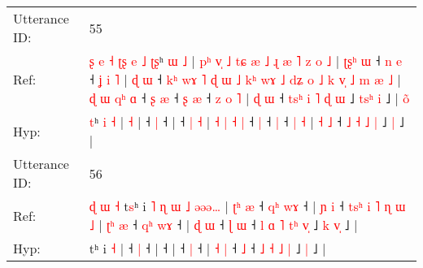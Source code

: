\documentclass[10pt]{article}
\DeclareRobustCommand{\hl}[1]{{\textcolor{red}{#1}}}
\begin{document}
\begin{longtable}{ll}
 \\
\midrule
Utterance ID: & 55 \\
Ref: & \hl{ʂ}\hl{ }\hl{e}\hl{ }\hl{˧}\hl{ }\hl{ʈ}\hl{ʂ}\hl{ }\hl{e}\hl{ }\hl{˩}\hl{ }\hl{ʈ}\hl{ʂ}ʰ \hl{ɯ} \hl{˩} |\hl{ }\hl{p}\hl{ʰ}\hl{ }\hl{v}\hl{̩}\hl{ }\hl{˩}\hl{ }\hl{t}\hl{ɕ}\hl{ }\hl{æ}\hl{ }\hl{˩}\hl{ }\hl{ɻ}\hl{ }\hl{æ}\hl{ }\hl{˥}\hl{ }\hl{z}\hl{ }\hl{o} \hl{˩} |\hl{ }\hl{ʈ}\hl{ʂ}\hl{ʰ}\hl{ }\hl{ɯ} ˧\hl{ }\hl{n} \hl{e} ˧\hl{ }\hl{ʝ}\hl{ }\hl{i}\hl{ }\hl{˥} |\hl{ }\hl{ɖ}\hl{ }\hl{ɯ} ˧\hl{ }\hl{k}\hl{ʰ}\hl{ }\hl{w}\hl{ɤ}\hl{ }\hl{˥}\hl{ }\hl{ɖ}\hl{ }\hl{ɯ}\hl{ }\hl{˩}\hl{ }\hl{k}\hl{ʰ}\hl{ }\hl{w}\hl{ɤ}\hl{ }\hl{˩}\hl{ }\hl{d}\hl{ʑ}\hl{ }\hl{o}\hl{ }\hl{˩}\hl{ }\hl{k}\hl{ }\hl{v}\hl{̩}\hl{ }\hl{˩}\hl{ }\hl{m} \hl{æ} \hl{˩} | \hl{ɖ} \hl{ɯ} \hl{q}\hl{ʰ} \hl{ɑ} ˧\hl{ }\hl{ʂ} \hl{æ} ˧\hl{ }\hl{ʂ} \hl{æ} ˧\hl{ }\hl{z} \hl{o} \hl{˥} | \hl{ɖ} \hl{ɯ} ˧\hl{ }\hl{t}\hl{s}\hl{ʰ} \hl{i} \hl{˥} \hl{ɖ} \hl{ɯ} ˩\hl{ }\hl{t}\hl{s}\hl{ʰ} \hl{i} ˩ |\hl{ }\hl{o}\hl{̃}
 \\
Hyp: & \hl{}\hl{}\hl{}\hl{}\hl{}\hl{}\hl{}\hl{}\hl{}\hl{}\hl{}\hl{}\hl{}\hl{}\hl{t}ʰ \hl{i} \hl{˧} |\hl{}\hl{}\hl{}\hl{}\hl{}\hl{}\hl{}\hl{}\hl{}\hl{}\hl{}\hl{}\hl{}\hl{}\hl{}\hl{}\hl{}\hl{}\hl{}\hl{}\hl{}\hl{}\hl{}\hl{}\hl{} \hl{˧} |\hl{}\hl{}\hl{}\hl{}\hl{}\hl{} ˧\hl{}\hl{} \hl{|} ˧\hl{}\hl{}\hl{}\hl{}\hl{}\hl{} |\hl{}\hl{}\hl{}\hl{} ˧\hl{}\hl{}\hl{}\hl{}\hl{}\hl{}\hl{}\hl{}\hl{}\hl{}\hl{}\hl{}\hl{}\hl{}\hl{}\hl{}\hl{}\hl{}\hl{}\hl{}\hl{}\hl{}\hl{}\hl{}\hl{}\hl{}\hl{}\hl{}\hl{}\hl{}\hl{}\hl{}\hl{}\hl{}\hl{}\hl{}\hl{}\hl{} \hl{|} \hl{˧} | \hl{˧} \hl{|} \hl{}\hl{˧} \hl{|} ˧\hl{}\hl{} \hl{|} ˧\hl{}\hl{} \hl{|} ˧\hl{}\hl{} \hl{|} \hl{˧} | \hl{˧} \hl{˩} ˧\hl{}\hl{}\hl{}\hl{} \hl{˩} \hl{˧} \hl{˩} \hl{|} ˩\hl{}\hl{}\hl{}\hl{} \hl{|} ˩ |\hl{}\hl{}\hl{}
 \\
\midrule
Utterance ID: & 56 \\
Ref: & \hl{ɖ}\hl{ }\hl{ɯ}\hl{ }\hl{˧}\hl{ }t\hl{s}ʰ i\hl{ }\hl{˥}\hl{ }\hl{ɳ}\hl{ }\hl{ɯ}\hl{ }\hl{˩} \hl{ə}\hl{ə}\hl{ə}\hl{…} |\hl{ }\hl{ʈ}\hl{ʰ}\hl{ }\hl{æ} ˧\hl{ }\hl{q}\hl{ʰ} \hl{w}\hl{ɤ} ˧ |\hl{ }\hl{ɲ}\hl{ }\hl{i} ˧\hl{ }\hl{t}\hl{s}\hl{ʰ}\hl{ }\hl{i}\hl{ }\hl{˥}\hl{ }\hl{ɳ}\hl{ }\hl{ɯ}\hl{ }\hl{˩} |\hl{ }\hl{ʈ}\hl{ʰ}\hl{ }\hl{æ} ˧\hl{ }\hl{q}\hl{ʰ} \hl{w}\hl{ɤ} ˧ | \hl{ɖ} \hl{ɯ} ˧\hl{ }\hl{ɭ} \hl{ɯ} ˧\hl{ }\hl{l} \hl{ɑ} \hl{˥} \hl{t}\hl{ʰ} \hl{v}\hl{̩} ˩\hl{ }\hl{k} \hl{v}\hl{̩} ˩ |
 \\
Hyp: & \hl{}\hl{}\hl{}\hl{}\hl{}\hl{}t\hl{}ʰ i\hl{}\hl{}\hl{}\hl{}\hl{}\hl{}\hl{}\hl{} \hl{}\hl{}\hl{}\hl{˧} |\hl{}\hl{}\hl{}\hl{}\hl{} ˧\hl{}\hl{}\hl{} \hl{}\hl{|} ˧ |\hl{}\hl{}\hl{}\hl{} ˧\hl{}\hl{}\hl{}\hl{}\hl{}\hl{}\hl{}\hl{}\hl{}\hl{}\hl{}\hl{}\hl{}\hl{} |\hl{}\hl{}\hl{}\hl{}\hl{} ˧\hl{}\hl{}\hl{} \hl{}\hl{|} ˧ | \hl{˧} \hl{|} ˧\hl{}\hl{} \hl{˩} ˧\hl{}\hl{} \hl{˩} \hl{˧} \hl{}\hl{˩} \hl{}\hl{|} ˩\hl{}\hl{} \hl{}\hl{|} ˩ |

\end{longtable}
\end{document}
